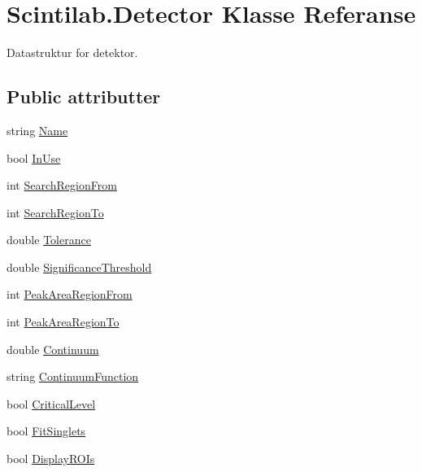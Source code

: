 \hypertarget{class_scintilab_1_1_detector}{\section{Scintilab.\+Detector Klasse Referanse}
\label{class_scintilab_1_1_detector}
}


Datastruktur for detektor.  


\subsection*{Public attributter}
\begin{DoxyCompactItemize}
\item 
string \hyperlink{class_scintilab_1_1_detector_aeddbda805641ca8d8f8aaa30aea2f3e0}{Name}
\item 
bool \hyperlink{class_scintilab_1_1_detector_aef0a8b33c3daf31ab0dcb374625e4c30}{In\+Use}
\item 
int \hyperlink{class_scintilab_1_1_detector_ac146023ebad60cb211ae8845c0477c16}{Search\+Region\+From}
\item 
int \hyperlink{class_scintilab_1_1_detector_a8ae7ae2c5777ca6ab94e9940979f9b88}{Search\+Region\+To}
\item 
double \hyperlink{class_scintilab_1_1_detector_a4641161eb001c1de9b81e5681f489acf}{Tolerance}
\item 
double \hyperlink{class_scintilab_1_1_detector_a47d61c404bffea0634c018b1eb394689}{Significance\+Threshold}
\item 
int \hyperlink{class_scintilab_1_1_detector_a13b0edf1a6c0daa1b656ef2c0f80be3b}{Peak\+Area\+Region\+From}
\item 
int \hyperlink{class_scintilab_1_1_detector_a818975b79ec85722917ea173ec185d5b}{Peak\+Area\+Region\+To}
\item 
double \hyperlink{class_scintilab_1_1_detector_a989e067403b2aff60db811ca0a3338b4}{Continuum}
\item 
string \hyperlink{class_scintilab_1_1_detector_a93e4175d688c37df65977e8e8ccc9b0c}{Continuum\+Function}
\item 
bool \hyperlink{class_scintilab_1_1_detector_abab4c22c4ed6af134af2029a8e9b848e}{Critical\+Level}
\item 
bool \hyperlink{class_scintilab_1_1_detector_a58aec3021d18afed051a50a18999a2d2}{Fit\+Singlets}
\item 
bool \hyperlink{class_scintilab_1_1_detector_ac96f9499ed6b860c9d64d7767801fae4}{Display\+R\+O\+Is}
\item 

\end{DoxyCompactItemize}
